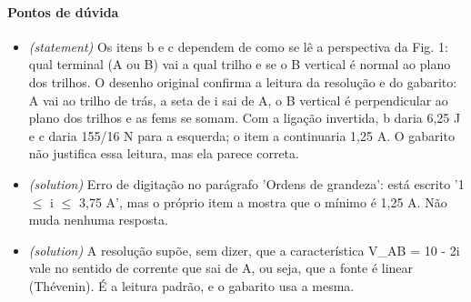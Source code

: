 \documentclass{article}%
\begin{document}
\paragraph{Pontos de dúvida}%
\begin{itemize}%
\item%
\textit{(statement)} Os itens b e c dependem de como se lê a perspectiva da Fig. 1: qual terminal (A ou B) vai a qual trilho e se o B vertical é normal ao plano dos trilhos. O desenho original confirma a leitura da resolução e do gabarito: A vai ao trilho de trás, a seta de i sai de A, o B vertical é perpendicular ao plano dos trilhos e as fems se somam. Com a ligação invertida, b daria 6,25 J e c daria 155/16 N para a esquerda; o item a continuaria 1,25 A. O gabarito não justifica essa leitura, mas ela parece correta.%
\item%
\textit{(solution)} Erro de digitação no parágrafo 'Ordens de grandeza': está escrito '1 $\leq$ i $\leq$ 3,75 A', mas o próprio item a mostra que o mínimo é 1,25 A. Não muda nenhuma resposta.%
\item%
\textit{(solution)} A resolução supõe, sem dizer, que a característica V\_AB = 10 - 2i vale no sentido de corrente que sai de A, ou seja, que a fonte é linear (Thévenin). É a leitura padrão, e o gabarito usa a mesma.%
\end{itemize}%
\end{document}
